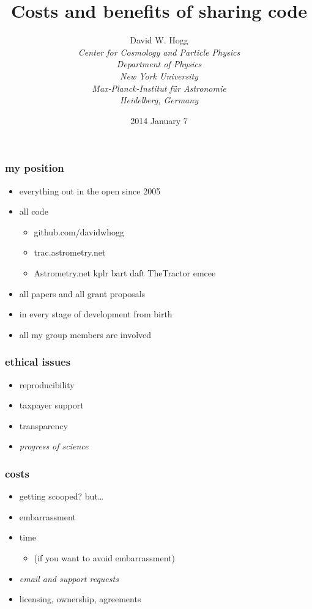\documentclass[pdftex]{beamer}
\title{Costs and benefits of sharing code}
\author[David W. Hogg (NYU)]{David W. Hogg \\[1ex]
  \textsl{\small Center for Cosmology and Particle Physics\\
                 Department of Physics\\
                 New York University\\[1ex]
                 Max-Planck-Institut f\"ur Astronomie\\
                 Heidelberg, Germany}}
\date{2014 January 7}
\begin{document}
\begin{frame}
  \titlepage
\end{frame}

\begin{frame}
  \frametitle{my position}
  \begin{itemize}
  \item everything out in the open since 2005
  \item all code
    \begin{itemize}
    \item github.com/davidwhogg
    \item trac.astrometry.net
    \item Astrometry.net kplr bart daft TheTractor emcee
    \end{itemize}
  \item all papers and all grant proposals
  \item in every stage of development from birth
  \item all my group members are involved
  \end{itemize}
\end{frame}

\begin{frame}
  \frametitle{ethical issues}
  \begin{itemize}
  \item reproducibility
  \item taxpayer support
  \item transparency
  \item \emph{progress of science}
  \end{itemize}
\end{frame}

\begin{frame}
  \frametitle{costs}
  \begin{itemize}
  \item getting scooped? but\ldots
  \item embarrassment
  \item time
    \begin{itemize}
    \item (if you want to avoid embarrassment)
    \end{itemize}
  \item \emph{email and support requests}
  \item licensing, ownership, agreements
  \end{itemize}
\end{frame}
\end{document}
